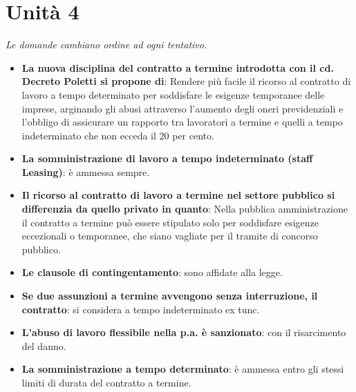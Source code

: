 \documentclass[12pt, a4paper]{report}
\begin{document}
\chapter{Unità 4}
    \textit{Le domande cambiano ordine ad ogni tentativo.}
    \begin{itemize}
        \item \textbf{La nuova disciplina del contratto a termine introdotta con il cd. Decreto Poletti si propone di}: Rendere più facile il ricorso al contratto di lavoro a tempo determinato per soddisfare le esigenze temporanee delle imprese, arginando gli abusi attraverso l’aumento degli oneri previdenziali e l’obbligo di assicurare un rapporto tra lavoratori a termine e quelli a tempo indeterminato che non ecceda il 20 per cento.
        \item \textbf{La somministrazione di lavoro a tempo indeterminato (staff Leasing)}: è ammessa sempre.
        \item \textbf{Il ricorso al contratto di lavoro a termine nel settore pubblico si differenzia da quello privato in quanto}: Nella pubblica amministrazione il contratto a termine può essere stipulato solo per soddisfare esigenze eccezionali o temporanee, che siano vagliate per il tramite di concorso pubblico.
        \item \textbf{Le clausole di contingentamento}: sono affidate alla legge.
        \item \textbf{Se due assunzioni a termine avvengono senza interruzione, il contratto}: si considera a tempo indeterminato ex tunc.
        \item \textbf{L’abuso di lavoro flessibile nella p.a. è sanzionato}: con il risarcimento del danno.
        \item \textbf{La somministrazione a tempo determinato}: è ammessa entro gli stessi limiti di durata del contratto a termine.
    \end{itemize}
\end{document}
